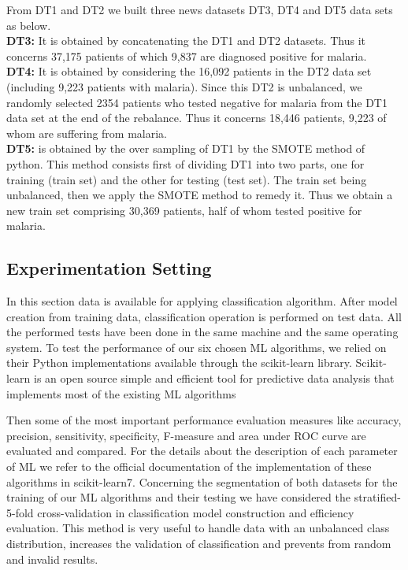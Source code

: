From DT1 and DT2 we built three news datasets DT3, DT4 and DT5 data sets as below.\\
\textbf{DT3:}  It is obtained by concatenating the DT1 and DT2 datasets. Thus it concerns 37,175 patients of which 9,837 are diagnosed positive for malaria.\\
\textbf{DT4:} It is obtained by considering the 16,092 patients in the DT2 data set (including 9,223 patients with malaria). Since this DT2 is unbalanced, we randomly selected 2354 patients who tested negative for malaria from the DT1 data set at the end of the rebalance. Thus it concerns 18,446 patients, 9,223 of whom are suffering from malaria.\\
\textbf{DT5:} is obtained by the over sampling of DT1 by the SMOTE method of python. This method consists first of dividing DT1 into two parts, one for training (train set) and the other for testing (test set). The train set being unbalanced, then we apply the SMOTE method to remedy it. Thus we obtain a new train set comprising 30,369 patients, half of whom tested positive for malaria.

\subsection{Experimentation Setting}
In this section data is available for applying classification algorithm. After model creation from training data, classification operation is performed on test data. 
All the performed tests have been done in the same machine and the same operating system. To test the performance of our six chosen ML algorithms, we relied on their Python implementations available through the scikit-learn library. Scikit-learn is an open source simple and efficient tool for predictive data analysis that implements most of the existing ML algorithms

Then some of the most important performance evaluation measures like accuracy, precision, sensitivity, specificity, F-measure and area under ROC curve are evaluated and compared. 
For the details about the description of each parameter of ML we refer to the official documentation of the implementation of these algorithms in scikit-learn7. Concerning the segmentation of both datasets for the training of our ML algorithms and their testing we have considered the stratified-5-fold cross-validation in classification model construction and efficiency evaluation. This method is very useful to handle data with an unbalanced class distribution, increases the validation of classification and prevents from random and invalid results.

